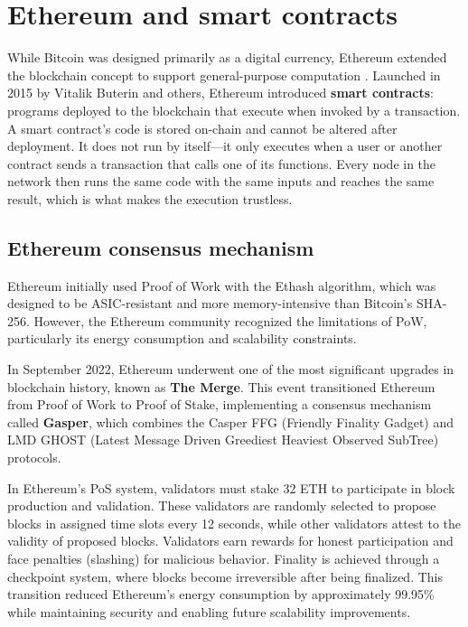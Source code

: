 \section{Ethereum and smart contracts}
While Bitcoin was designed primarily as a digital currency, Ethereum extended the blockchain concept to support general-purpose computation \cite{antonopoulos2018mastering}. Launched in 2015 by Vitalik Buterin and others, Ethereum introduced \textbf{smart contracts}: programs deployed to the blockchain that execute when invoked by a transaction. A smart contract's code is stored on-chain and cannot be altered after deployment. It does not run by itself---it only executes when a user or another contract sends a transaction that calls one of its functions. Every node in the network then runs the same code with the same inputs and reaches the same result, which is what makes the execution trustless.

\subsection{Ethereum consensus mechanism}
Ethereum initially used Proof of Work with the Ethash algorithm, which was designed to be ASIC-resistant and more memory-intensive than Bitcoin's SHA-256. However, the Ethereum community recognized the limitations of PoW, particularly its energy consumption and scalability constraints.

In September 2022, Ethereum underwent one of the most significant upgrades in blockchain history, known as \textbf{The Merge}. This event transitioned Ethereum from Proof of Work to Proof of Stake, implementing a consensus mechanism called \textbf{Gasper}, which combines the Casper FFG (Friendly Finality Gadget) and LMD GHOST (Latest Message Driven Greediest Heaviest Observed SubTree) protocols.

In Ethereum's PoS system, validators must stake 32 ETH to participate in block production and validation. These validators are randomly selected to propose blocks in assigned time slots every 12 seconds, while other validators attest to the validity of proposed blocks. Validators earn rewards for honest participation and face penalties (slashing) for malicious behavior. Finality is achieved through a checkpoint system, where blocks become irreversible after being finalized. This transition reduced Ethereum's energy consumption by approximately 99.95\% while maintaining security and enabling future scalability improvements.

